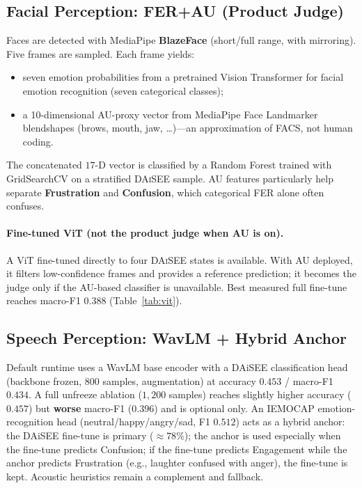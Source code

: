 \documentclass[conference]{IEEEtran}
\begin{document}
\subsection{Facial Perception: FER+AU (Product Judge)}
\label{sec:fer}

Faces are detected with MediaPipe \textbf{BlazeFace} (short/full range, with
mirroring). Five frames are sampled. Each frame yields:
\begin{itemize}
\item seven emotion probabilities from a pretrained Vision Transformer for
facial emotion recognition (seven categorical classes);
\item a 10-dimensional AU-proxy vector from MediaPipe Face Landmarker
blendshapes (brows, mouth, jaw, \ldots)---an approximation of FACS, not human
coding.
\end{itemize}
The concatenated $17$-D vector is classified by a Random Forest trained with
GridSearchCV on a stratified \textsc{DAiSEE} sample. AU features particularly
help separate \textbf{Frustration} and \textbf{Confusion}, which categorical
FER alone often confuses.

\paragraph{Fine-tuned ViT (not the product judge when AU is on).}
A ViT fine-tuned directly to four \textsc{DAiSEE} states is available. With AU
deployed, it filters low-confidence frames and provides a reference prediction;
it becomes the judge only if the AU-based classifier is unavailable. Best
measured full fine-tune reaches macro-F1 $0.388$ (Table~\ref{tab:vit}).

\subsection{Speech Perception: WavLM + Hybrid Anchor}
\label{sec:ser}

Default runtime uses a WavLM base encoder with a DAiSEE classification head
(backbone frozen, $800$ samples, augmentation) at accuracy $0.453$ /
macro-F1 $0.434$. A full unfreeze ablation ($1{,}200$ samples) reaches slightly
higher accuracy ($0.457$) but \textbf{worse} macro-F1 ($0.396$) and is optional
only. An IEMOCAP emotion-recognition head (neutral/happy/angry/sad, F1
$0.512$) acts as a hybrid anchor: the DAiSEE fine-tune is primary
($\approx 78\%$); the anchor is used especially when the fine-tune predicts
Confusion; if the fine-tune predicts Engagement while the anchor predicts
Frustration (e.g., laughter confused with anger), the fine-tune is kept.
Acoustic heuristics remain a complement and fallback.
\end{document}
